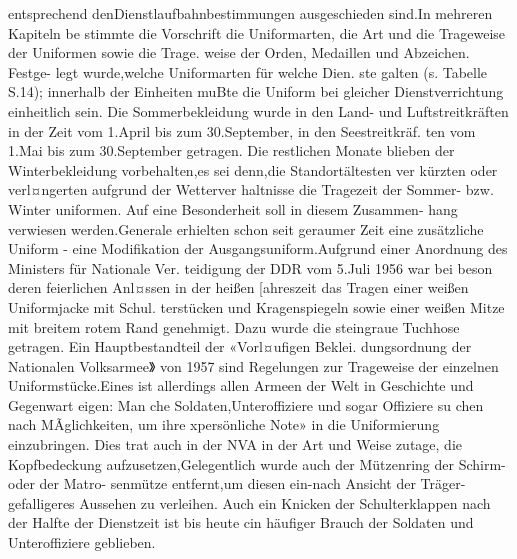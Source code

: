 entsprechend denDienstlaufbahnbestimmungen
ausgeschieden sind.In mehreren Kapiteln
be
stimmte die Vorschrift die Uniformarten, die Art
und die Trageweise der Uniformen sowie die Trage.
weise der Orden, Medaillen und Abzeichen. Festge-
legt wurde,welche Uniformarten für welche Dien.
ste galten (s. Tabelle S.14); innerhalb der Einheiten
muBte die Uniform bei gleicher Dienstverrichtung
einheitlich sein. Die Sommerbekleidung wurde in
den Land- und Luftstreitkräften in der Zeit vom
1.April bis zum 30.September, in den Seestreitkräf.
ten vom 1.Mai bis zum 30.September getragen. Die
restlichen Monate blieben der Winterbekleidung
vorbehalten,es sei denn,die Standortältesten ver
kürzten oder verl¤ngerten aufgrund der Wetterver
haltnisse die Tragezeit der Sommer- bzw. Winter
uniformen.
Auf eine Besonderheit soll in diesem Zusammen-
hang verwiesen werden.Generale erhielten schon
seit geraumer Zeit eine zusätzliche Uniform - eine
Modifikation der Ausgangsuniform.Aufgrund
einer Anordnung des Ministers für Nationale Ver.
teidigung der DDR vom 5.Juli 1956 war bei beson
deren feierlichen Anl¤ssen in der heißen [ahreszeit
das Tragen einer weißen Uniformjacke mit Schul.
terstücken und Kragenspiegeln sowie einer weißen
Mitze mit breitem rotem Rand genehmigt. Dazu
wurde die steingraue Tuchhose getragen.
Ein Hauptbestandteil der «Vorl¤ufigen Beklei.
dungsordnung der Nationalen Volksarmee》 von
1957 sind Regelungen zur Trageweise der einzelnen
Uniformstücke.Eines ist allerdings allen Armeen
der Welt in Geschichte und Gegenwart eigen: Man
che Soldaten,Unteroffiziere und sogar Offiziere su
chen nach MÃglichkeiten, um ihre xpersönliche
Note» in die Uniformierung einzubringen. Dies trat
auch in der NVA in der Art und Weise zutage, die
Kopfbedeckung aufzusetzen,Gelegentlich wurde
auch der Mützenring der Schirm- oder der Matro-
senmütze entfernt,um diesen ein-nach Ansicht der Träger-gefalligeres Aussehen zu verleihen.
Auch ein Knicken der Schulterklappen nach der
Halfte der Dienstzeit ist bis heute cin häufiger
Brauch der Soldaten und Unteroffiziere geblieben.